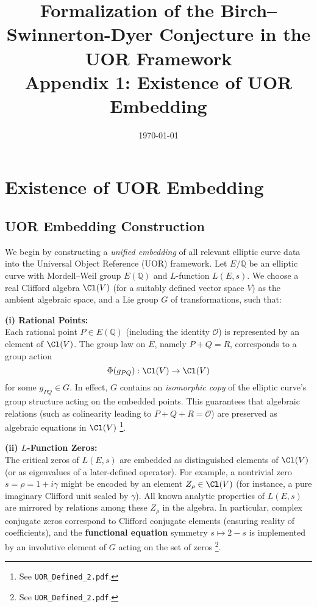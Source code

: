 \documentclass[11pt]{article}
\title{Formalization of the Birch--Swinnerton-Dyer Conjecture in the UOR Framework \\ Appendix 1: Existence of UOR Embedding}
\author{}
\date{\today}
\begin{document}
\maketitle

\section{Existence of UOR Embedding}

\subsection*{UOR Embedding Construction}
We begin by constructing a \emph{unified embedding} of all relevant elliptic curve data into the Universal Object Reference (UOR) framework. Let \(E/\mathbb{Q}\) be an elliptic curve with Mordell--Weil group \(E(\mathbb{Q})\) and \(L\)-function \(L(E,s)\). We choose a real Clifford algebra \(\Cl(V)\) (for a suitably defined vector space \(V\)) as the ambient algebraic space, and a Lie group \(G\) of transformations, such that:

\bigskip

\textbf{(i) Rational Points:} \\
Each rational point \(P\in E(\mathbb{Q})\) (including the identity \(\mathcal{O}\)) is represented by an element of \(\Cl(V)\). The group law on \(E\), namely \(P+Q=R\), corresponds to a group action 
\[
\Phi(g_{PQ}): \Cl(V) \to \Cl(V)
\]
for some \(g_{PQ}\in G\). In effect, \(G\) contains an \emph{isomorphic copy} of the elliptic curve’s group structure acting on the embedded points. This guarantees that algebraic relations (such as colinearity leading to \(P+Q+R=\mathcal{O}\)) are preserved as algebraic equations in \(\Cl(V)\) 
\footnote{See \texttt{UOR\_Defined\_2.pdf}.}.

\bigskip

\textbf{(ii) \(L\)-Function Zeros:} \\
The critical zeros of \(L(E,s)\) are embedded as distinguished elements of \(\Cl(V)\) (or as eigenvalues of a later-defined operator). For example, a nontrivial zero \(s=\rho=1+i\gamma\) might be encoded by an element \(Z_\rho\in\Cl(V)\) (for instance, a pure imaginary Clifford unit scaled by \(\gamma\)). All known analytic properties of \(L(E,s)\) are mirrored by relations among these \(Z_\rho\) in the algebra. In particular, complex conjugate zeros correspond to Clifford conjugate elements (ensuring reality of coefficients), and the \textbf{functional equation} symmetry \(s\mapsto 2-s\) is implemented by an involutive element of \(G\) acting on the set of zeros 
\footnote{See \texttt{UOR\_Defined\_2.pdf}.}.
\end{document}
